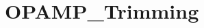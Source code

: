 \hypertarget{group___o_p_a_m_p___trimming}{\section{O\-P\-A\-M\-P\-\_\-\-Trimming}
\label{group___o_p_a_m_p___trimming}
}
